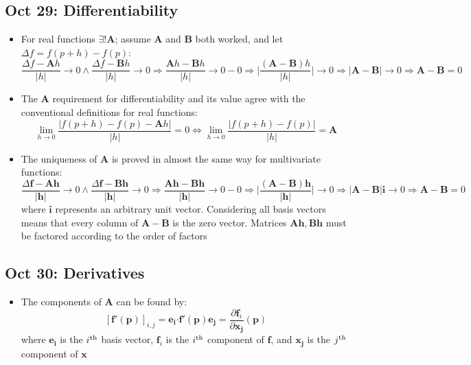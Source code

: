 \documentclass[10pt, oneside]{article}
\newcommand{\del}{\partial}
\newcommand{\Cdot}{\boldsymbol{\cdot}}
\renewcommand{\vec}[1]{\mathbf{#1}}
\newcommand{\vecf}[1]{\boldsymbol{#1}}
\newcommand{\mat}[1]{\mathbf{#1}}
\begin{document}
\subsection{Oct 29: Differentiability}
\begin{itemize}
    \item For real functions $\exists! \mat{A}$; assume $\mat{A}$ and $\mat{B}$ both worked, and let $\Delta f = f(p+h) - f(p)$:
        \[\frac{\Delta f - \mat{A}h}{|h|} \rightarrow 0 \land \frac{\Delta f - \mat{B}h}{|h|} \rightarrow 0 \Rightarrow \frac{\mat{A}h - \mat{B}h}{|h|} \rightarrow 0 - 0 \Rightarrow \bigg| \frac{(\mat{A} - \mat{B})h}{|h|} \bigg| \rightarrow 0 \Rightarrow |\mat{A} - \mat{B}| \rightarrow 0 \Rightarrow \mat{A} - \mat{B} = 0\]
    \item The $\mat{A}$ requirement for differentiability and its value agree with the conventional definitions for real functions:
        \[\lim_{h \rightarrow 0} \frac{|f(p + h) - f(p) - \mat{A}h|}{|h|} = 0 \Leftrightarrow \lim_{h \rightarrow 0} \frac{|f(p + h) - f(p)|}{|h|} = \mat{A}\]
    \item The uniqueness of $\mat{A}$ is proved in almost the same way for multivariate functions:
        \[\frac{\Delta \vecf{f} - \mat{A}\vec{h}}{|\vec{h}|} \rightarrow 0 \land \frac{\Delta \vecf{f} - \mat{B}\vec{h}}{|\vec{h}|} \rightarrow 0 \Rightarrow \frac{\mat{A}\vec{h} - \mat{B}\vec{h}}{|\vec{h}|} \rightarrow 0 - 0 \Rightarrow \bigg| \frac{(\mat{A} - \mat{B})\vec{h}}{|\vec{h}|} \bigg| \rightarrow 0 \Rightarrow |\mat{A} - \mat{B}|\vec{i} \rightarrow 0 \Rightarrow \mat{A} - \mat{B} = 0\]
    where $\vec{i}$ represents an arbitrary unit vector. Considering all basis vectors means that every column of $\mat{A} - \mat{B}$ is the zero vector. Matrices $\mat{A}\vec{h}, \mat{B}\vec{h}$ must be factored according to the order of factors
\end{itemize}

\subsection{Oct 30: Derivatives}
\begin{itemize}
    \item The components of $\mat{A}$ can be found by:
        \[[\vecf{f}'(\vec{p})]_{i,j} = \vec{e_i} \Cdot \vecf{f}'(\vec{p}) \vec{e_j} = \frac{\del \vecf{f}_i}{\del \vec{x_j}} (\vec{p})\]
        where $\vec{e_i}$ is the $i^{\rm{th}}$ basis vector, $\vecf{f}_i$ is the $i^{\rm{th}}$ component of $\vecf{f}$, and $\vec{x_j}$ is the $j^{\rm{th}}$ component of $\vec{x}$
\end{itemize}
\end{document}
